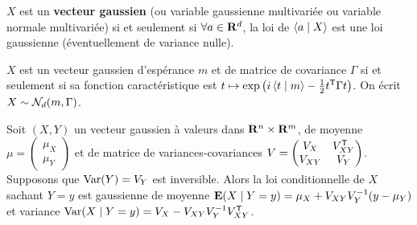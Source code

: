 \begin{defn}
	$X$ est un \textbf{vecteur gaussien} (ou variable gaussienne multivariée ou variable normale multivariée) si et seulement si $\forall a \in \mathbf{R}^d$, la loi de $\left\langle a \mid X \right\rangle$ est une loi gaussienne (éventuellement de variance nulle).
\end{defn}

\begin{thm}
	$X$ est un vecteur gaussien d’espérance $m$ et de matrice de covariance $\Gamma$ si et seulement si sa fonction caractéristique est $t \mapsto \exp \left( i \left\langle t \mid m \right\rangle - \frac{1}{2} t^\mathsf{T} \Gamma t \right)$.
	On écrit $X \sim \mathcal{N}_d(m,\Gamma)$.
\end{thm}

\begin{pop}
	Soit $(X,Y)$ un vecteur gaussien à valeurs dans $\mathbf{R}^n \times \mathbf{R}^m$, de moyenne $\mu = \begin{pmatrix} \mu_X \\ \mu_Y \end{pmatrix}$ et de matrice de variances-covariances $V = \begin{pmatrix} V_X & V_{XY}^\mathsf{T} \\ V_{XY} & V_Y \end{pmatrix}$.
	Supposons que $\operatorname{Var}(Y) = V_Y$ est inversible.
	Alors la loi conditionnelle de $X$ sachant $Y = y$ est gaussienne de moyenne $\mathbf{E}(X \mid Y = y) = \mu_X + V_{XY} V_Y^{-1} (y - \mu_Y)$ et variance $\operatorname{Var}(X \mid Y = y) = V_X - V_{XY} V_Y^{-1} V_{XY}^\mathsf{T}$.
\end{pop}
